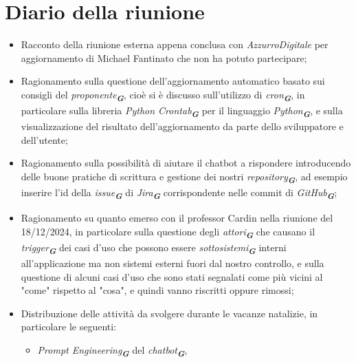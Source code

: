 
\section{Diario della riunione}

\begin{itemize}
    \item Racconto della riunione esterna appena conclusa con \emph{AzzurroDigitale} per aggiornamento di Michael Fantinato che non ha potuto
    partecipare;
    \item Ragionamento sulla questione dell'aggiornamento automatico basato sui consigli del 
    \emph{proponente}\textsubscript{\textit{\textbf{G}}}, cioè si è discusso sull'utilizzo di \emph{cron}\textsubscript{\textit{\textbf{G}}}, 
    in particolare sulla libreria \emph{Python Crontab}\textsubscript{\textit{\textbf{G}}}
    per il linguaggio \emph{Python}\textsubscript{\textit{\textbf{G}}}, e sulla visualizzazione del risultato dell'aggiornamento da
    parte dello sviluppatore e dell'utente;
    \item Ragionamento sulla possibilità di aiutare il chatbot a rispondere introducendo delle buone pratiche di scrittura e 
    gestione dei nostri \emph{repository}\textsubscript{\textit{\textbf{G}}}, ad esempio inserire l'id della 
    \emph{issue}\textsubscript{\textit{\textbf{G}}} di \emph{Jira}\textsubscript{\textit{\textbf{G}}} corrispondente nelle commit di \emph{GitHub}\textsubscript{\textit{\textbf{G}}};
    \item Ragionamento su quanto emerso con il professor Cardin nella riunione del 18/12/2024, in particolare sulla questione degli
    \emph{attori}\textsubscript{\textit{\textbf{G}}} che causano il \emph{trigger}\textsubscript{\textit{\textbf{G}}} dei casi d'uso che possono essere 
    \emph{sottosistemi}\textsubscript{\textit{\textbf{G}}} interni all'applicazione ma non sistemi esterni fuori dal nostro controllo, e sulla questione di alcuni casi d'uso
    che sono stati segnalati come più vicini al "come" rispetto al "cosa", e quindi vanno riscritti oppure rimossi;
    \item Distribuzione delle attività da svolgere durante le vacanze natalizie, in particolare le seguenti:
    \begin{itemize}
        \item \emph{Prompt Engineering}\textsubscript{\textit{\textbf{G}}} del \emph{chatbot}\textsubscript{\textit{\textbf{G}}}, 

\end{itemize}
\end{itemize}
